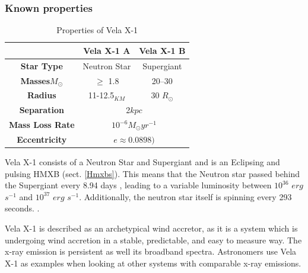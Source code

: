 \documentclass[12pt, letterpaper]{article}
\begin{document}
    \begin{table}
            \subsubsection{Known properties}
            \begin{center}
                \begin{tabular}{||c | c  c||} 
                 \hline
                 & Vela X-1 A & Vela X-1 B  \\ 
                 \hline\hline
                 \textbf{Star Type} & Neutron Star & Supergiant \cite{Kretschmar_2021} \\ 
                 \hline
                 \textbf{Masses}\(M_\odot\) & $\ge$ 1.8 \cite{Kretschmar_2021} & 20–30 \cite{Kretschmar_2021} \\
                 \hline
                 \textbf{Radius} & 11-12.5$_{KM}$ \cite{Kretschmar_2021} & 30 \(R_\odot\)
                 \cite{Kretschmar_2021} \\ %
                 \hline 
                 \textbf{Separation} &  \multicolumn{2}{c||}{2$kpc$ \cite{Kretschmar_2021}} \\
                 \hline 
                 \textbf{Mass Loss Rate} & \multicolumn{2}{c||}{$10^{-6} M_\odot yr^{-1}$ \cite{Kretschmar_2021}} \\
                 \hline
                 \textbf{Eccentricity} & \multicolumn{2}{c||}{$ e \approx  0.0898)$ \cite{Kretschmar_2021}} \\
                 \hline
                \end{tabular}
                \caption{Properties of Vela X-1} 
                \label{VelaX1} 
            \end{center}
    \end{table}

        Vela X-1 consists of a Neutron Star and Supergiant and is an Eclipsing and pulsing HMXB (sect. \ref{Hmxbs}). This means that the Neutron star passed behind the Supergiant every 8.94 days \cite{Falanga_2015}, leading to a variable luminosity between $10^{36}$ $erg$ $s^{-1}$ and $10^{37}$ $erg$ $s^{-1}$. Additionally, the neutron star itself is spinning every 293 seconds. \cite{Kretschmar_2021}. 
        
        Vela X-1 is described as an archetypical wind accretor, as it is a system which is undergoing wind accretion in a stable, predictable, and easy to measure way. The x-ray emission is persistent as well its broadband spectra. Astronomers use Vela X-1 as examples when looking at other systems with comparable x-ray emissions. \cite{Kretschmar_2021}
        
\end{document}
